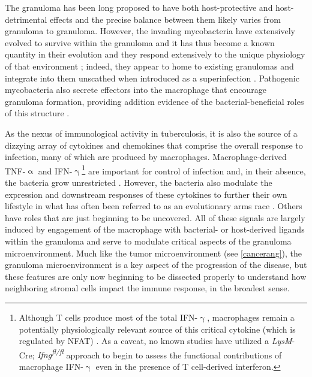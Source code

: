 The granuloma has been long proposed to have both host\hyp{}protective and host\hyp{}detrimental effects and the precise balance between them likely varies from granuloma to granuloma. However, the invading mycobacteria have extensively evolved to survive within the granuloma and it has thus become a known quantity in their evolution and they respond extensively to the unique physiology of that environment \citep{Gagneux2018, Ramakrishnan2000}; indeed, they appear to home to existing granulomas and integrate into them unscathed when introduced as a superinfection \citep{Cosma2004}. Pathogenic mycobacteria also secrete effectors into the macrophage that encourage granuloma formation, providing addition evidence of the bacterial\hyp{}beneficial roles of this structure \citep{Volkman2004, Volkman2010}. 

As the nexus of immunological activity in tuberculosis, it is also the source of a dizzying array of cytokines and chemokines that comprise the overall response to infection, many of which are produced by macrophages. Macrophage\hyp{}derived TNF\hyp{}$\upalpha$ and IFN\hyp{}$\upgamma$\footnote{Although T cells produce most of the total IFN\hyp{}$\upgamma$, macrophages remain a potentially physiologically relevant source of this critical cytokine (which is regulated by NFAT) \citep{Darwich2009, Robinson2010}. As a caveat, no known studies have utilized a \textit{LysM}\hyp{}Cre; \textit{Ifng\textsuperscript{fl/fl}} approach to begin to assess the functional contributions of macrophage IFN\hyp{}$\upgamma$ even in the presence of T cell\hyp{}derived interferon.} are important for control of infection and, in their absence, the bacteria grow unrestricted \citep{Fenton1997, Flynn1993, Flynn1995, Algood2005}. However, the bacteria also modulate the expression and downstream responses of these cytokines to further their own lifestyle in what has often been referred to as an evolutionary arms race \citep{Ting1999}. Others have roles that are just beginning to be uncovered. All of these signals are largely induced by engagement of the macrophage with bacterial\hyp{} or host\hyp{}derived ligands within the granuloma and serve to modulate critical aspects of the granuloma microenvironment. Much like the tumor microenvironment (see \autoref{cancerang}), the granuloma microenvironment is a key aspect of the progression of the disease, but these features are only now beginning to be dissected properly to understand how neighboring stromal cells impact the immune response, in the broadest sense. 

